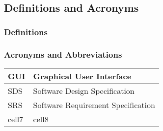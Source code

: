 \documentclass[a4paper, 11pt]{article}
\begin{document}
\subsection{Definitions and Acronyms}
\subsubsection{Definitions}
\subsubsection{Acronyms and Abbreviations}

	\begin{tabular}{ | m{1cm} | m{10cm} | } 
		\hline
		GUI & Graphical User Interface \\
		\hline
		SDS & Software Design Specification \\
		\hline
		SRS & Software Requirement Specification  \\
		\hline
		cell7 & cell8 \\
		\hline
	\end{tabular}
\end{document}
